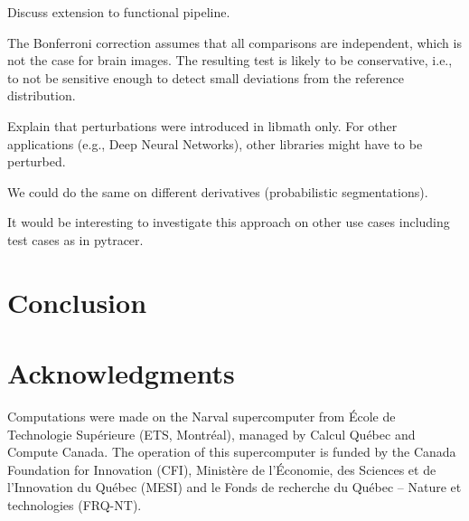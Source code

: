 \documentclass{article}
\begin{document}
Discuss extension to functional pipeline.


The Bonferroni correction assumes that all comparisons are independent, which is
not the case for brain images. The resulting test is likely to be conservative,
i.e., to not be sensitive enough to detect small deviations from the reference
distribution.

Explain that perturbations were introduced in libmath only. For other
applications (e.g., Deep Neural Networks), other libraries might have to be
perturbed.

We could do the same on different derivatives (probabilistic segmentations).


It would be interesting to investigate this approach on other use cases
including test cases as in pytracer.

\section{Conclusion}
\section{Acknowledgments}

Computations were made on the Narval supercomputer from \'Ecole de Technologie
Sup\'erieure (ETS, Montr\'eal), managed by Calcul Québec and Compute Canada. The
operation of this supercomputer is funded by the Canada Foundation for
Innovation (CFI), Ministère de l’Économie, des Sciences et de l’Innovation du
Québec (MESI) and le Fonds de recherche du Québec – Nature et technologies
(FRQ-NT).
\end{document}
